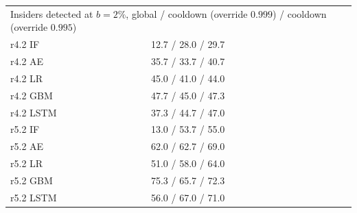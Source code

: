 \begin{table}[!t]
{\begin{tabular}{lcccccc}
\midrule
\multicolumn{7}{l}{Insiders detected at $b=2\%$, global / cooldown (override $0.999$) / cooldown (override $0.995$)} \\
\multicolumn{2}{l}{r4.2 IF} & \multicolumn{5}{l}{12.7 / 28.0 / 29.7} \\
\multicolumn{2}{l}{r4.2 AE} & \multicolumn{5}{l}{35.7 / 33.7 / 40.7} \\
\multicolumn{2}{l}{r4.2 LR} & \multicolumn{5}{l}{45.0 / 41.0 / 44.0} \\
\multicolumn{2}{l}{r4.2 GBM} & \multicolumn{5}{l}{47.7 / 45.0 / 47.3} \\
\multicolumn{2}{l}{r4.2 LSTM} & \multicolumn{5}{l}{37.3 / 44.7 / 47.0} \\
\multicolumn{2}{l}{r5.2 IF} & \multicolumn{5}{l}{13.0 / 53.7 / 55.0} \\
\multicolumn{2}{l}{r5.2 AE} & \multicolumn{5}{l}{62.0 / 62.7 / 69.0} \\
\multicolumn{2}{l}{r5.2 LR} & \multicolumn{5}{l}{51.0 / 58.0 / 64.0} \\
\multicolumn{2}{l}{r5.2 GBM} & \multicolumn{5}{l}{75.3 / 65.7 / 72.3} \\
\multicolumn{2}{l}{r5.2 LSTM} & \multicolumn{5}{l}{56.0 / 67.0 / 71.0} \\
\bottomrule
\end{tabular}}
\end{table}

